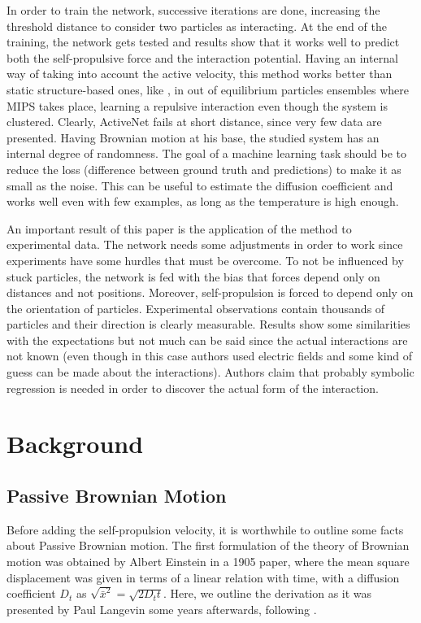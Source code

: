 \documentclass[../../master_thesis_np.tex]{subfiles}
\begin{document}
	In order to train the network, successive iterations are done, increasing the threshold distance to consider two particles as interacting. At the end of the training, the network gets tested and results show that it works well to predict both the self-propulsive force and the interaction potential. Having an internal way of taking into account the active velocity, this method works better than static structure-based ones, like \cite{bag_interaction_2021}, in out of equilibrium particles ensembles where MIPS takes place, learning a repulsive interaction even though the system is clustered. Clearly, ActiveNet fails at short distance, since very few data are presented. Having Brownian motion at his base, the studied system has an internal degree of randomness. The goal of a machine learning task should be to reduce the loss (difference between ground truth and predictions) to make it as small as the noise. This can be useful to estimate the diffusion coefficient and works well even with few examples, as long as the temperature is high enough. 
	
	An important result of this paper is the application of the method to experimental data. The network needs some adjustments in order to work since experiments have some hurdles that must be overcome. To not be influenced by stuck particles, the network is fed with the bias that forces depend only on distances and not positions. Moreover, self-propulsion is forced to depend only on the orientation of particles. Experimental observations contain thousands of particles and their direction is clearly measurable. Results show some similarities with the expectations but not much can be said since the actual interactions are not known (even though in this case authors used electric fields and some kind of guess can be made about the interactions). Authors claim that probably symbolic regression is needed in order to discover the actual form of the interaction.
	
	\section{Background}
	\subsection{Passive Brownian Motion}

	Before adding the self-propulsion velocity, it is worthwhile to outline some facts about Passive Brownian motion. The first formulation of the theory of Brownian motion was obtained by Albert Einstein in a 1905 paper, where the mean square displacement was given in terms of a linear relation with time, with a diffusion coefficient $D_t$ as $\sqrt{\bar{x}^2} = \sqrt{2D_t t}$. Here, we outline the derivation as it was presented by Paul Langevin some years afterwards, following \cite{gardiner_handbook_2004}.
	
\end{document}
